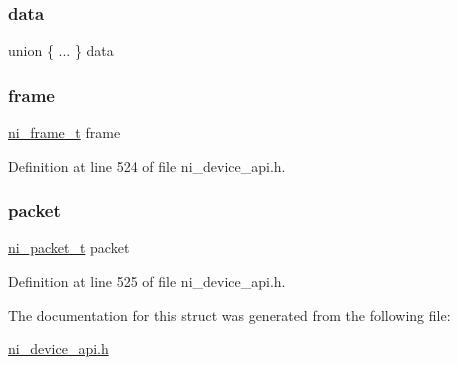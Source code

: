 \subsubsection{\texorpdfstring{data}{data}}
{\footnotesize\ttfamily union \{ ... \}  data}

\mbox{\label{struct__ni__session__data__io_aea2177bca942215ff8bda12a813375f3}} 
\subsubsection{\texorpdfstring{frame}{frame}}
{\footnotesize\ttfamily \mbox{\hyperlink{ni__device__api_8h_a3105b2de7051b2d7e2676b132b1d8b95}{ni\+\_\+frame\+\_\+t}} frame}



Definition at line 524 of file ni\+\_\+device\+\_\+api.\+h.

\mbox{\label{struct__ni__session__data__io_a5f6a5891ce9ba762cfb6cd08965e3acb}} 
\subsubsection{\texorpdfstring{packet}{packet}}
{\footnotesize\ttfamily \mbox{\hyperlink{ni__device__api_8h_aa2b6b671c9baca6fd1eb993a13c04188}{ni\+\_\+packet\+\_\+t}} packet}



Definition at line 525 of file ni\+\_\+device\+\_\+api.\+h.



The documentation for this struct was generated from the following file\+:\begin{DoxyCompactItemize}
\item 
\mbox{\hyperlink{ni__device__api_8h}{ni\+\_\+device\+\_\+api.\+h}}\end{DoxyCompactItemize}
